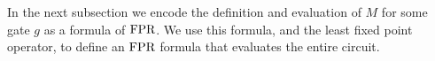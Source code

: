 \documentclass[../paper.tex]{subfiles}
\begin{document}
In the next subsection we encode the definition and evaluation of $M$ for some
gate $g$ as a formula of $\text{\upshape FPR}$. We use this formula, and the least fixed point
operator, to define an $\text{\upshape FPR}$ formula that evaluates the entire circuit.









\end{document}
